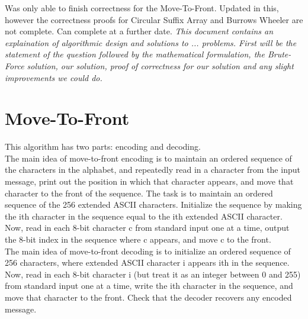 \documentclass[12pt]{article}
\begin{document}

\newcommand{\hmwkClass}{COS 255}
\newcommand{\hmwkSemester}{Spring 2016}

\newcommand{\hmwkAuthorName}{Annamalis \& Lukas}
\newcommand{\hmwkAuthorID}{asharp\&lleung}

\newcommand{\hmwkAssignmentNum}{1}

\newcommand{\hmwkProblemNum}{0}

\newcommand{\hmwkCollaborators}{}
\thispagestyle{fancycollab}


\noindent
Was only able to finish correctness for the Move-To-Front. Updated in this, however the correctness
proofs for Circular Suffix Array and Burrows Wheeler are not complete. Can complete at a further date.
{\em This document contains an explaination of algorithmic design and solutions to ... problems.
 First will be the statement of the question followed by the mathematical formulation, the
 Brute-Force solution, our solution, proof of correctness for our solution and any slight
 improvements we could do.}


\section{Move-To-Front}
This algorithm has two parts: encoding and decoding. \\
\indent The main idea of move-to-front encoding is to maintain an ordered sequence of  the characters
in the alphabet, and repeatedly read in a character from the input message, print out the
position in which that character appears, and move that character to the front of the sequence.
The task is to maintain an ordered sequence of the 256 extended ASCII characters. Initialize
the sequence by making the ith character in the sequence equal to the ith extended ASCII
character. Now, read in each 8-bit character c from standard input one at a time, output the
8-bit index in the sequence where c appears, and move c to the front. \\
\indent The main idea of move-to-front decoding is to initialize an ordered sequence of 256 characters,
where extended ASCII character i appears ith in the sequence. Now, read in each 8-bit character
i (but treat it as an integer between 0 and 255) from standard input one at a time, write the
ith character in the sequence, and move that character to the front. Check that the decoder
recovers any encoded message.
\end{document}
